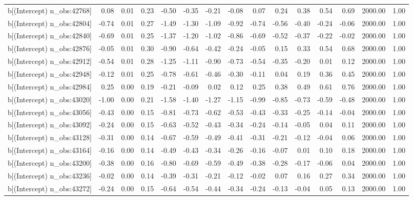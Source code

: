 \begin{table}[ht]
\begin{tabular}{rrrrrrrrrrrrrrr}
  b[(Intercept) n\_obs:42768] & 0.08 & 0.01 & 0.23 & -0.50 & -0.35 & -0.21 & -0.08 & 0.07 & 0.24 & 0.38 & 0.54 & 0.69 & 2000.00 & 1.00 \\ 
  b[(Intercept) n\_obs:42804] & -0.74 & 0.01 & 0.27 & -1.49 & -1.30 & -1.09 & -0.92 & -0.74 & -0.56 & -0.40 & -0.24 & -0.06 & 2000.00 & 1.00 \\ 
  b[(Intercept) n\_obs:42840] & -0.69 & 0.01 & 0.25 & -1.37 & -1.20 & -1.02 & -0.86 & -0.69 & -0.52 & -0.37 & -0.22 & -0.02 & 2000.00 & 1.00 \\ 
  b[(Intercept) n\_obs:42876] & -0.05 & 0.01 & 0.30 & -0.90 & -0.64 & -0.42 & -0.24 & -0.05 & 0.15 & 0.33 & 0.54 & 0.68 & 2000.00 & 1.00 \\ 
  b[(Intercept) n\_obs:42912] & -0.54 & 0.01 & 0.28 & -1.25 & -1.11 & -0.90 & -0.73 & -0.54 & -0.35 & -0.20 & 0.01 & 0.12 & 2000.00 & 1.00 \\ 
  b[(Intercept) n\_obs:42948] & -0.12 & 0.01 & 0.25 & -0.78 & -0.61 & -0.46 & -0.30 & -0.11 & 0.04 & 0.19 & 0.36 & 0.45 & 2000.00 & 1.00 \\ 
  b[(Intercept) n\_obs:42984] & 0.25 & 0.00 & 0.19 & -0.21 & -0.09 & 0.02 & 0.12 & 0.25 & 0.38 & 0.49 & 0.61 & 0.76 & 2000.00 & 1.00 \\ 
  b[(Intercept) n\_obs:43020] & -1.00 & 0.00 & 0.21 & -1.58 & -1.40 & -1.27 & -1.15 & -0.99 & -0.85 & -0.73 & -0.59 & -0.48 & 2000.00 & 1.00 \\ 
  b[(Intercept) n\_obs:43056] & -0.43 & 0.00 & 0.15 & -0.81 & -0.73 & -0.62 & -0.53 & -0.43 & -0.33 & -0.25 & -0.14 & -0.04 & 2000.00 & 1.00 \\ 
  b[(Intercept) n\_obs:43092] & -0.24 & 0.00 & 0.15 & -0.63 & -0.52 & -0.43 & -0.34 & -0.24 & -0.14 & -0.05 & 0.04 & 0.11 & 2000.00 & 1.00 \\ 
  b[(Intercept) n\_obs:43128] & -0.31 & 0.00 & 0.14 & -0.67 & -0.59 & -0.49 & -0.41 & -0.31 & -0.21 & -0.12 & -0.04 & 0.06 & 2000.00 & 1.00 \\ 
  b[(Intercept) n\_obs:43164] & -0.16 & 0.00 & 0.14 & -0.49 & -0.43 & -0.34 & -0.26 & -0.16 & -0.07 & 0.01 & 0.10 & 0.18 & 2000.00 & 1.00 \\ 
  b[(Intercept) n\_obs:43200] & -0.38 & 0.00 & 0.16 & -0.80 & -0.69 & -0.59 & -0.49 & -0.38 & -0.28 & -0.17 & -0.06 & 0.04 & 2000.00 & 1.00 \\ 
  b[(Intercept) n\_obs:43236] & -0.02 & 0.00 & 0.14 & -0.39 & -0.31 & -0.21 & -0.12 & -0.02 & 0.07 & 0.16 & 0.27 & 0.34 & 2000.00 & 1.00 \\ 
  b[(Intercept) n\_obs:43272] & -0.24 & 0.00 & 0.15 & -0.64 & -0.54 & -0.44 & -0.34 & -0.24 & -0.13 & -0.04 & 0.05 & 0.13 & 2000.00 & 1.00 \\ 

\end{tabular}
\end{table}
